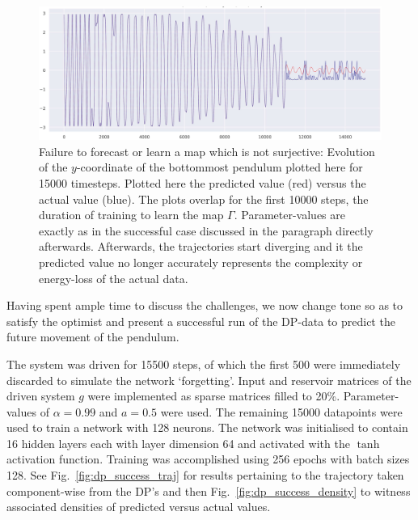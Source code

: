 \begin{figure}[ht]
  \includegraphics[scale=0.3]{Graphs/_dpfail_nonsurj.eps}
  \centering
\caption{Failure to forecast or learn a map which is not surjective: Evolution of the $y$-coordinate of the bottommost pendulum plotted here for 15000 timesteps. Plotted here the predicted value (red) versus the actual value (blue). The plots overlap for the first 10000 steps, the duration of training to learn the map $\Gamma$. Parameter-values are exactly as in the successful case discussed in the paragraph directly afterwards. Afterwards, the trajectories start diverging and it the predicted value no longer accurately represents the complexity or energy-loss of the actual data. }
\label{fig:dp_notsurjective}
\end{figure}


Having spent ample time to discuss the challenges, we now change tone so as to satisfy the optimist and present a successful run of the DP-data to predict the future movement of the pendulum.

The system was driven for 15500 steps, of which the first 500 were immediately discarded to simulate the network `forgetting'. 
Input and reservoir matrices of the driven system $g$ were implemented as sparse matrices filled to 20\%. Parameter-values of $\alpha=0.99$ and $a=0.5$ were used.
The remaining 15000 datapoints were used to train a network with 128 neurons. 
The network was initialised to contain 16 hidden layers each with layer dimension 64 and activated with the $\tanh$ activation function.
Training was accomplished using 256 epochs with batch sizes 128. See Fig.~\ref{fig:dp_success_traj} for results pertaining to the trajectory taken component-wise from the DP's and then Fig.~\ref{fig:dp_success_density} to witness associated densities of predicted versus actual values.

